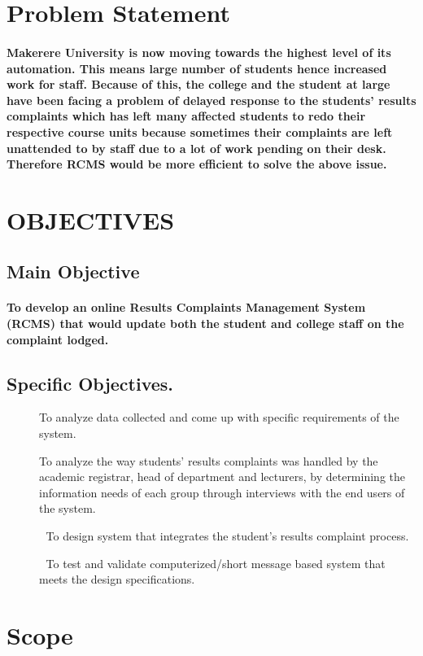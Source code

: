 \documentclass[10pt]{article}
\begin{document}
   \section{Problem Statement}
   \paragraph{Makerere University is now moving towards the highest level of its automation. This means large number of students hence increased work for staff. Because of this, the college and the student at large have been facing a problem of delayed response to the students’ results complaints which has left many affected students to redo their respective course units because sometimes their complaints are left unattended to by staff due to a lot of work pending on their desk. Therefore RCMS would be more efficient to solve the above issue.}
\section{OBJECTIVES}
\subsection{Main Objective}
\paragraph{To develop an online Results Complaints Management System (RCMS) that would update both the student and college staff on the complaint lodged.}
  \subsection{Specific Objectives.}
 \begin{description}
 \item[]	To analyze data collected and come up with specific requirements of the system.
  \item[]
  To analyze the way students’ results complaints was handled by the academic registrar, head of department and lecturers, by determining the information needs of each group through interviews with the end users of the system.
  \item[]
  	To design system that integrates the student’s results complaint process.
   \item[]
   	To test and validate computerized/short message based system that meets the design specifications.
 \end{description}
\section{Scope}
\end{document}
